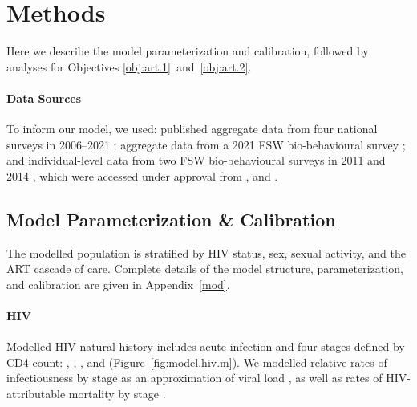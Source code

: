 \section{Methods}\label{art.meth}
Here we describe the model parameterization and calibration,
followed by analyses for Objectives \ref{obj:art.1}~and~\ref{obj:art.2}.
\paragraph{Data Sources}
To inform our model, we used:
published aggregate data from four national surveys
in 2006--2021 \cite{SDHS2006,SHIMS1,SHIMS2,SHIMS3};
aggregate data from a 2021 FSW bio-behavioural survey \cite{EswIBBS2022}; and
individual-level data from two FSW bio-behavioural surveys
in 2011 \cite{Baral2014} and 2014 \cite{EswKP2014},
which were accessed under approval from
, and
.
\subsection{Model Parameterization \& Calibration}\label{art.meth.par}
The modelled population is stratified by
HIV status, sex, sexual activity, and the ART cascade of care.
Complete details of the model structure, parameterization, and calibration
are given in Appendix~\ref{mod}.
\mf{} %
\paragraph{HIV}
Modelled HIV natural history
includes acute infection and four stages defined by CD4-count:
, , , and 
(Figure~\ref{fig:model.hiv.m}).
We modelled relative rates of infectiousness by stage
as an approximation of viral load \cite{Boily2009,Donnell2010,Bellan2015},
as well as rates of HIV-attributable mortality by stage \cite{Mangal2017}.
